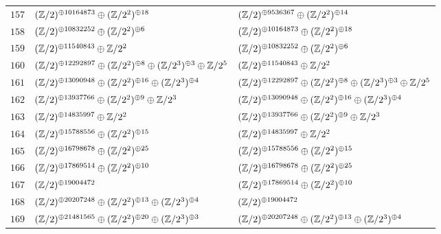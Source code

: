 \begin{supertabular}{|c|p{5.5cm}|p{5.5cm}|}
$157$%
&$(\mathbb{Z}/2)^{\oplus10164873}\oplus(\mathbb{Z}/2^{2})^{\oplus18}$%
&$(\mathbb{Z}/2)^{\oplus9536367}\oplus(\mathbb{Z}/2^{2})^{\oplus14}$\\

$158$%
&$(\mathbb{Z}/2)^{\oplus10832252}\oplus(\mathbb{Z}/2^{2})^{\oplus6}$%
&$(\mathbb{Z}/2)^{\oplus10164873}\oplus(\mathbb{Z}/2^{2})^{\oplus18}$\\

$159$%
&$(\mathbb{Z}/2)^{\oplus11540843}\oplus\mathbb{Z}/2^{2}$%
&$(\mathbb{Z}/2)^{\oplus10832252}\oplus(\mathbb{Z}/2^{2})^{\oplus6}$\\

$160$%
&$(\mathbb{Z}/2)^{\oplus12292897}\oplus(\mathbb{Z}/2^{2})^{\oplus8}\oplus(\mathbb{Z}/2^{3})^{\oplus3}\oplus\mathbb{Z}/2^{5}$%
&$(\mathbb{Z}/2)^{\oplus11540843}\oplus\mathbb{Z}/2^{2}$\\

$161$%
&$(\mathbb{Z}/2)^{\oplus13090948}\oplus(\mathbb{Z}/2^{2})^{\oplus16}\oplus(\mathbb{Z}/2^{3})^{\oplus4}$%
&$(\mathbb{Z}/2)^{\oplus12292897}\oplus(\mathbb{Z}/2^{2})^{\oplus8}\oplus(\mathbb{Z}/2^{3})^{\oplus3}\oplus\mathbb{Z}/2^{5}$\\

$162$%
&$(\mathbb{Z}/2)^{\oplus13937766}\oplus(\mathbb{Z}/2^{2})^{\oplus9}\oplus\mathbb{Z}/2^{3}$%
&$(\mathbb{Z}/2)^{\oplus13090948}\oplus(\mathbb{Z}/2^{2})^{\oplus16}\oplus(\mathbb{Z}/2^{3})^{\oplus4}$\\

$163$%
&$(\mathbb{Z}/2)^{\oplus14835997}\oplus\mathbb{Z}/2^{2}$%
&$(\mathbb{Z}/2)^{\oplus13937766}\oplus(\mathbb{Z}/2^{2})^{\oplus9}\oplus\mathbb{Z}/2^{3}$\\

$164$%
&$(\mathbb{Z}/2)^{\oplus15788556}\oplus(\mathbb{Z}/2^{2})^{\oplus15}$%
&$(\mathbb{Z}/2)^{\oplus14835997}\oplus\mathbb{Z}/2^{2}$\\

$165$%
&$(\mathbb{Z}/2)^{\oplus16798678}\oplus(\mathbb{Z}/2^{2})^{\oplus25}$%
&$(\mathbb{Z}/2)^{\oplus15788556}\oplus(\mathbb{Z}/2^{2})^{\oplus15}$\\

$166$%
&$(\mathbb{Z}/2)^{\oplus17869514}\oplus(\mathbb{Z}/2^{2})^{\oplus10}$%
&$(\mathbb{Z}/2)^{\oplus16798678}\oplus(\mathbb{Z}/2^{2})^{\oplus25}$\\

$167$%
&$(\mathbb{Z}/2)^{\oplus19004472}$%
&$(\mathbb{Z}/2)^{\oplus17869514}\oplus(\mathbb{Z}/2^{2})^{\oplus10}$\\

$168$%
&$(\mathbb{Z}/2)^{\oplus20207248}\oplus(\mathbb{Z}/2^{2})^{\oplus13}\oplus(\mathbb{Z}/2^{3})^{\oplus4}$%
&$(\mathbb{Z}/2)^{\oplus19004472}$\\

$169$%
&$(\mathbb{Z}/2)^{\oplus21481565}\oplus(\mathbb{Z}/2^{2})^{\oplus20}\oplus(\mathbb{Z}/2^{3})^{\oplus3}$%
&$(\mathbb{Z}/2)^{\oplus20207248}\oplus(\mathbb{Z}/2^{2})^{\oplus13}\oplus(\mathbb{Z}/2^{3})^{\oplus4}$\\


\end{supertabular}
